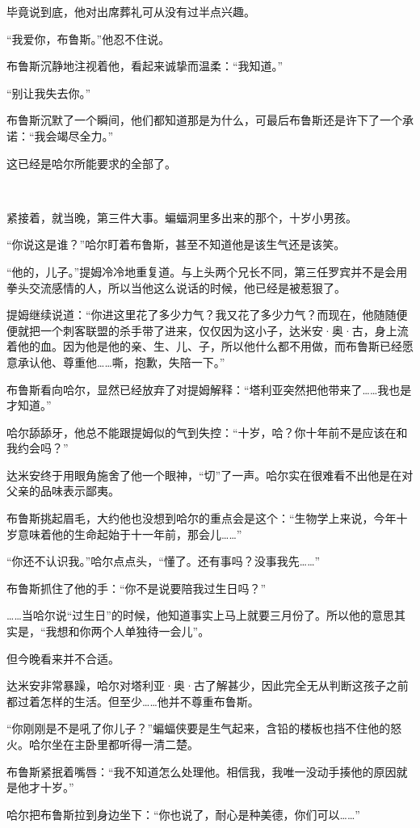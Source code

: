 \documentclass[../main]{subfiles}
\begin{document}
毕竟说到底，他对出席葬礼可从没有过半点兴趣。

“我爱你，布鲁斯。”他忍不住说。

布鲁斯沉静地注视着他，看起来诚挚而温柔：“我知道。”

“别让我失去你。”

布鲁斯沉默了一个瞬间，他们都知道那是为什么，可最后布鲁斯还是许下了一个承诺：“我会竭尽全力。”

这已经是哈尔所能要求的全部了。

~\

紧接着，就当晚，第三件大事。蝙蝠洞里多出来的那个，十岁小男孩。

“你说这是谁？”哈尔盯着布鲁斯，甚至不知道他是该生气还是该笑。

“他的，儿子。”提姆冷冷地重复道。与上头两个兄长不同，第三任罗宾并不是会用拳头交流感情的人，所以当他这么说话的时候，他已经是被惹狠了。

提姆继续说道：“你进这里花了多少力气？我又花了多少力气？而现在，他随随便便就把一个刺客联盟的杀手带了进来，仅仅因为这小子，达米安·奥·古，身上流着他的血。因为他是他的亲、生、儿、子，所以他什么都不用做，而布鲁斯已经愿意承认他、尊重他……嘶，抱歉，失陪一下。”

布鲁斯看向哈尔，显然已经放弃了对提姆解释：“塔利亚突然把他带来了……我也是才知道。”

哈尔舔舔牙，他总不能跟提姆似的气到失控：“十岁，哈？你十年前不是应该在和我约会吗？”

达米安终于用眼角施舍了他一个眼神，“切”了一声。哈尔实在很难看不出他是在对父亲的品味表示鄙夷。

布鲁斯挑起眉毛，大约他也没想到哈尔的重点会是这个：“生物学上来说，今年十岁意味着他的生命起始于十一年前，那会儿……”

“你还不认识我。”哈尔点点头，“懂了。还有事吗？没事我先……”

布鲁斯抓住了他的手：“你不是说要陪我过生日吗？”

……当哈尔说“过生日”的时候，他知道事实上马上就要三月份了。所以他的意思其实是，“我想和你两个人单独待一会儿”。

但今晚看来并不合适。

达米安非常暴躁，哈尔对塔利亚·奥·古了解甚少，因此完全无从判断这孩子之前都过着怎样的生活。但至少……他并不尊重布鲁斯。

“你刚刚是不是吼了你儿子？”蝙蝠侠要是生气起来，含铅的楼板也挡不住他的怒火。哈尔坐在主卧里都听得一清二楚。

布鲁斯紧抿着嘴唇：“我不知道怎么处理他。相信我，我唯一没动手揍他的原因就是他才十岁。”

哈尔把布鲁斯拉到身边坐下：“你也说了，耐心是种美德，你们可以……”
\end{document}
